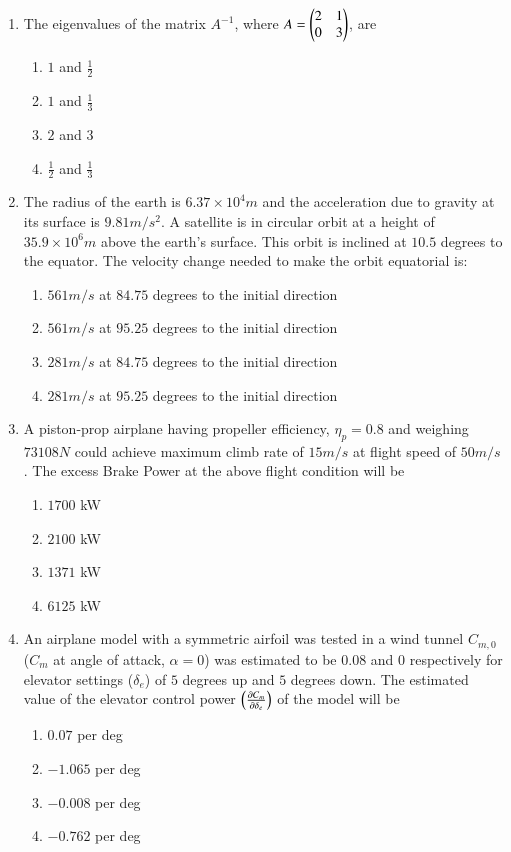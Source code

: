 \documentclass[journal]{IEEEtran}
\begin{document}
\begin{enumerate}
	\item The eigenvalues of the matrix $A^{-1}$, where $A = \begin{pmatrix}2&1\\0&3\end{pmatrix}$, are
		\begin{enumerate}
			\item $1$ and $\frac{1}{2}$
			\item $1$ and $\frac{1}{3}$
			\item $2$ and $3$
			\item $\frac{1}{2}$ and $\frac{1}{3}$
		\end{enumerate}

	\item The radius of the earth is $6.37 \times 10^4 m$ and the acceleration due to gravity at its surface is $9.81 m / s^2$. A satellite is in circular orbit at a height of $35.9\times 10^6 m$ above the earth's surface. This orbit is inclined at $10.5$ degrees to the equator. The velocity change needed to make the orbit equatorial is:
		\begin{enumerate}
			\item $561 m / s$ at $84.75$ degrees to the initial direction
			\item $561 m / s$ at $95.25$ degrees to the initial direction
			\item $281 m / s$ at $84.75$ degrees to the initial direction
			\item $281 m / s$ at $95.25$ degrees to the initial direction
		\end{enumerate}

	\item A piston-prop airplane having propeller efficiency, $\eta_p = 0.8$ and weighing $73108 N$ could achieve maximum climb rate of $15m/s$ at flight speed of $50m/s$. The excess Brake Power  at the above flight condition will be
		\begin{enumerate}
			\item $1700$ kW
			\item $2100$ kW
			\item $1371$ kW
			\item $6125$ kW
		\end{enumerate}
	\item An airplane model with a symmetric airfoil was tested in a wind tunnel $C_{m,0}$ ($C_m$ at angle of attack, $\alpha = 0$) was estimated to be $0.08$ and $0$ respectively for elevator settings ($\delta _ e$) of $5$ degrees up and $5$ degrees down. The estimated value of the elevator control power $\left(\frac{\partial C_m}{\partial \delta _ e}\right)$ of the model will be 
		\begin{enumerate}
			\item $0.07$ per deg
			\item $-1.065$ per deg
			\item $-0.008$ per deg
			\item $-0.762$ per deg
		\end{enumerate}
\end{enumerate}
\end{document}
